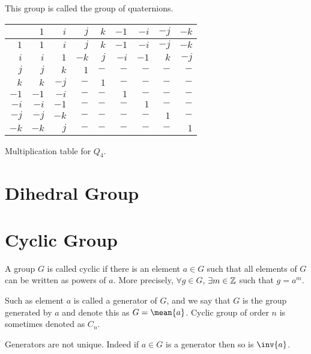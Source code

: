 \documentclass[11pt]{penrose}
\newcommand{\cyclic}[1]{\mean{#1}}
\begin{document}
This group is called the group of quaternions.
\begin{center}
    \begin{tabularx}{0.62\textwidth}{|R|R|R|R|R|R|R|R|R|}
        \hline
             & $ 1$ & $ i$ & $ j$ & $ k$ & $-1$ & $-i$ & $-j$ & $-k$ \\ \hline
        $ 1$ & $ 1$ & $ i$ & $ j$ & $ k$ & $-1$ & $-i$ & $-j$ & $-k$ \\ \hline
        $ i$ & $ i$ & $ 1$ & $-k$ & $ j$ & $-i$ & $-1$ & $ k$ & $-j$ \\ \hline
        $ j$ & $ j$ & $ k$ & $ 1$ & $ -$ & $ -$ & $ -$ & $ -$ & $ -$ \\ \hline
        $ k$ & $ k$ & $-j$ & $ -$ & $ 1$ & $ -$ & $ -$ & $ -$ & $ -$ \\ \hline
        $-1$ & $-1$ & $-i$ & $ -$ & $ -$ & $ 1$ & $ -$ & $ -$ & $ -$ \\ \hline
        $-i$ & $-i$ & $-1$ & $ -$ & $ -$ & $ -$ & $ 1$ & $ -$ & $ -$ \\ \hline
        $-j$ & $-j$ & $-k$ & $ -$ & $ -$ & $ -$ & $ -$ & $ 1$ & $ -$ \\ \hline
        $-k$ & $-k$ & $ j$ & $ -$ & $ -$ & $ -$ & $ -$ & $ -$ & $ 1$ \\ \hline
    \end{tabularx}

    {Multiplication table for $Q_4$.}
\end{center}

\section{Dihedral Group}


\section{Cyclic Group}
\begin{ndfn}
    A group $G$ is called cyclic if there is an element $a \in G$ such that all elements of $G$ can be written as powers of $a$. More precisely, $\forall g \in G$, $\exists m \in \mathbb{Z}$ such that $g = a^m$.

    Such as element $a$ is called a generator of $G$, and we say that $G$ is the group generated by $a$ and denote this as $G = \cyclic{a}$. Cyclic group of order $n$ is sometimes denoted as $C_n$.
\end{ndfn}

Generators are not unique. Indeed if $a \in G$ is a generator then so is $\inv{a}$.
\end{document}
